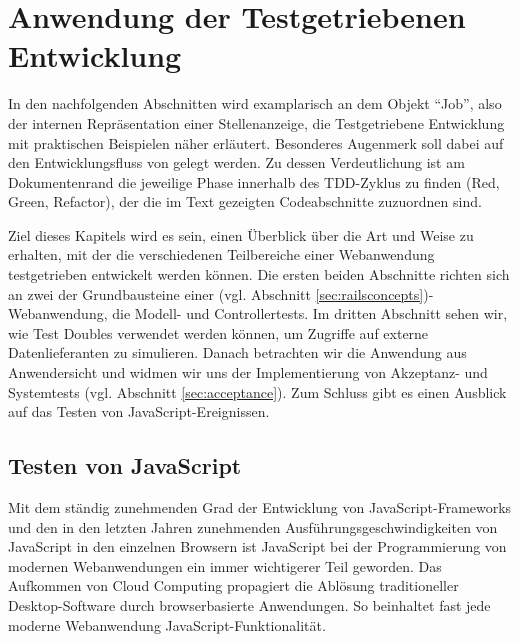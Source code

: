 \chapter{Anwendung der Testgetriebenen Entwicklung}
\label{sec:awtdd}

In den nachfolgenden Abschnitten wird examplarisch an dem Objekt "`Job"', also der internen Repräsentation einer Stellenanzeige, die Testgetriebene Entwicklung mit praktischen Beispielen näher erläutert.
Besonderes Augenmerk soll dabei auf den Entwicklungsfluss von  gelegt werden. Zu dessen Verdeutlichung ist am Dokumentenrand die jeweilige Phase innerhalb des TDD-Zyklus zu finden (Red, Green, Refactor), der die im Text gezeigten Codeabschnitte zuzuordnen sind.

Ziel dieses Kapitels wird es sein, einen Überblick über die Art und Weise zu erhalten, mit der die verschiedenen Teilbereiche einer Webanwendung testgetrieben entwickelt werden können.
Die ersten beiden Abschnitte richten sich an zwei der Grundbausteine einer  (vgl. Abschnitt \ref{sec:railsconcepts})-Webanwendung, die Modell- und Controllertests. Im dritten Abschnitt sehen wir, wie Test Doubles verwendet werden können, um Zugriffe auf externe Datenlieferanten zu simulieren. Danach betrachten wir die Anwendung aus Anwendersicht und widmen wir uns der Implementierung von Akzeptanz- und Systemtests (vgl. Abschnitt \ref{sec:acceptance}).
Zum Schluss gibt es einen Ausblick auf das Testen von JavaScript-Ereignissen.






\section{Testen von JavaScript}

Mit dem ständig zunehmenden Grad der Entwicklung von JavaScript-Frameworks und den in den letzten Jahren zunehmenden Ausführungsgeschwindigkeiten von JavaScript in den einzelnen Browsern ist JavaScript bei der Programmierung von modernen Webanwendungen ein immer wichtigerer Teil geworden. Das Aufkommen von Cloud Computing propagiert die Ablösung traditioneller Desktop-Software durch browserbasierte Anwendungen. So beinhaltet fast jede moderne Webanwendung JavaScript-Funktionalität.

